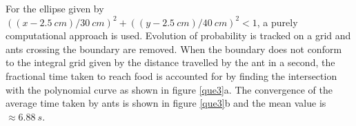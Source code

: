 \documentclass[11pt, a4paper]{article}
\begin{document}
For the ellipse given by $\left( (x - \SI{2.5}{cm}) / \SI{30}{cm} \right)^2 + \left( (y - \SI{2.5}{cm}) / \SI{40}{cm} \right)^2 < 1$, a purely computational approach is used. Evolution of probability is tracked on a grid and ants crossing the boundary are removed. When the boundary does not conform to the integral grid given by the distance travelled by the ant in a second, the fractional time taken to reach food is accounted for by finding the intersection with the polynomial curve as shown in figure \ref{que3}a. The convergence of the average time taken by ants is shown in figure \ref{que3}b and the mean value is $\approx \SI{6.88}{s}$.
\end{document}
